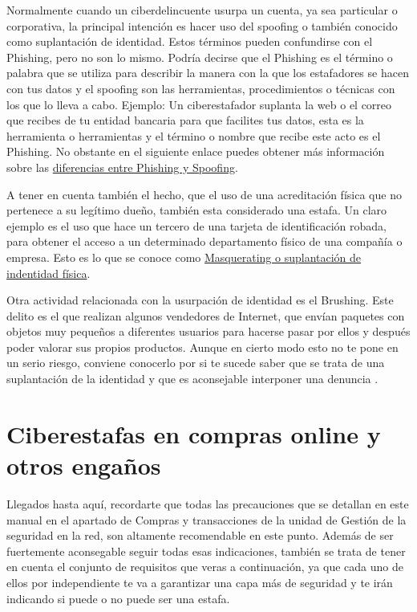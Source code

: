 \documentclass[
  spanish,
  a4paper,
  openany]{book}
\begin{document}
Normalmente cuando un ciberdelincuente usurpa un cuenta, ya sea particular o corporativa, la principal intención es hacer uso del spoofing o también conocido como suplantación de identidad. Estos términos pueden confundirse con el Phishing, pero no son lo mismo. Podría decirse que el Phishing es el término o palabra que se utiliza para describir la manera con la que los estafadores se hacen con tus datos y el spoofing son las herramientas, procedimientos o técnicas con los que lo lleva a cabo. Ejemplo: Un ciberestafador suplanta la web o el correo que recibes de tu entidad bancaria para que facilites tus datos, esta es la herramienta o herramientas y el término o nombre que recibe este acto es el Phishing. No obstante en el siguiente enlace puedes obtener más información sobre las \href{https://techlandia.com/diferencia-phishing-spoofing-info_241711/}{diferencias entre Phishing y Spoofing}.

A tener en cuenta también el hecho, que el uso de una acreditación física que no pertenece a su legítimo dueño, también esta considerado una estafa. Un claro ejemplo es el uso que hace un tercero de una tarjeta de identificación robada, para obtener el acceso a un determinado departamento físico de una compañía o empresa. Esto es lo que se conoce como \href{https://moodle2019-20.ua.es/moodle/pluginfile.php/113537/mod_resource/content/8/tema/4masquerading_mascarada.html\#:~:text=Consiste\%20en\%20suplantar\%20la\%20identidad,le\%20pertenecen\%20o\%20en\%20persona.}{Masquerating o suplantación de indentidad física}.

Otra actividad relacionada con la usurpación de identidad es el Brushing. Este delito es el que realizan algunos vendedores de Internet, que envían paquetes con objetos muy pequeños a diferentes usuarios para hacerse pasar por ellos y después poder valorar sus propios productos. Aunque en cierto modo esto no te pone en un serio riesgo, conviene conocerlo por si te sucede saber que se trata de una suplantación de la identidad y que es aconsejable interponer una denuncia \citep{brushing}.

\hypertarget{ciberestafas-en-compras-online-y-otros-engauxf1os}{%
\section{Ciberestafas en compras online y otros engaños}\label{ciberestafas-en-compras-online-y-otros-engauxf1os}}

Llegados hasta aquí, recordarte que todas las precauciones que se detallan en este manual en el apartado de Compras y transacciones de la unidad de Gestión de la seguridad en la red, son altamente recomendable en este punto. Además de ser fuertemente aconsegable seguir todas esas indicaciones, también se trata de tener en cuenta el conjunto de requisitos que veras a continuación, ya que cada uno de ellos por independiente te va a garantizar una capa más de seguridad y te irán indicando si puede o no puede ser una estafa.
\end{document}
